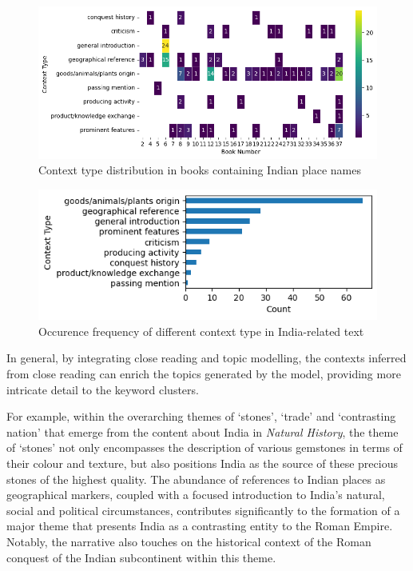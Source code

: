\documentclass[
  12pt,
]{article}
\begin{document}
\begin{figure}

{\centering \includegraphics{NHthesis_structure_files/figure-pdf/fig-book_context_distribution-output-1.png}

}

\caption{\label{fig-book_context_distribution}Context type distribution
in books containing Indian place names}

\end{figure}

\begin{figure}

{\centering \includegraphics{NHthesis_structure_files/figure-pdf/fig-context_type_freq-output-1.png}

}

\caption{\label{fig-context_type_freq}Occurence frequency of different
context type in India-related text}

\end{figure}

In general, by integrating close reading and topic modelling, the
contexts inferred from close reading can enrich the topics generated by
the model, providing more intricate detail to the keyword clusters.

For example, within the overarching themes of `stones', `trade' and
`contrasting nation' that emerge from the content about India in
\emph{Natural History}, the theme of `stones' not only encompasses the
description of various gemstones in terms of their colour and texture,
but also positions India as the source of these precious stones of the
highest quality. The abundance of references to Indian places as
geographical markers, coupled with a focused introduction to India's
natural, social and political circumstances, contributes significantly
to the formation of a major theme that presents India as a contrasting
entity to the Roman Empire. Notably, the narrative also touches on the
historical context of the Roman conquest of the Indian subcontinent
within this theme.
\end{document}
